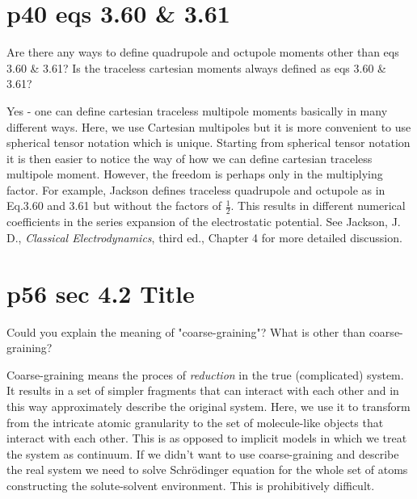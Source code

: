 \documentclass{exam}
\begin{document}
\section{p40 eqs 3.60 \& 3.61}

\begin{questions}
\question Are there any ways to define quadrupole and octupole moments other than eqs 3.60 \& 3.61? 
Is the traceless cartesian moments always defined as eqs 3.60 \& 3.61?

\begin{solution}
Yes - one can define cartesian traceless multipole moments basically in many different ways. Here, we use Cartesian
multipoles but it is more convenient to use spherical tensor notation which is unique. Starting from spherical tensor
notation it is then easier to notice the way of how we can define cartesian traceless multipole moment.
However, the freedom is perhaps only in the multiplying factor. For example, Jackson defines traceless
quadrupole and octupole as in Eq.3.60 and 3.61 but without the factors of $\frac{1}{2}$. This results in different
numerical coefficients in the series expansion of the electrostatic potential. See Jackson, J. D.,
\emph{Classical Electrodynamics}, third ed., Chapter 4 for more detailed discussion.
\end{solution}

\end{questions}

\section{p56 sec 4.2 Title}

\begin{questions}
\question Could you explain the meaning of "coarse-graining"? What is other than coarse-graining?

\begin{solution}
Coarse-graining means the proces of \emph{reduction} in the true (complicated) system.
It results in a set of simpler fragments that can interact with each other and in this way
approximately describe the original system. Here, we use it to transform from the intricate atomic granularity
to the set of molecule-like objects that interact with each other. This is as opposed to implicit models
in which we treat the system as continuum. If we didn't want to use coarse-graining and describe the real system
we need to solve Schr{\"o}dinger equation for the whole set of atoms constructing the solute-solvent environment.
This is prohibitively difficult.
\end{solution}

\end{questions}
\end{document}
